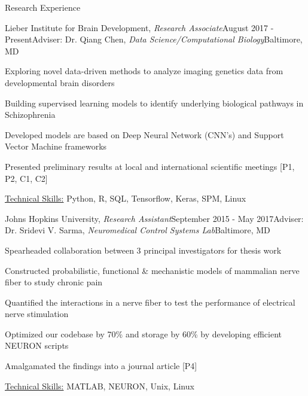 \documentclass{resume}
\begin{document}
  \begin{rSection}{Research Experience}
\begin{rSubsection}{Lieber Institute for Brain Development, \textit{Research Associate}}{August 2017 - Present}{Adviser: Dr. Qiang Chen, \textit{Data Science/Computational Biology}}{Baltimore, MD}
\item Exploring novel data-driven methods to analyze imaging genetics data from developmental brain disorders
\item Building supervised learning models to identify underlying biological pathways in Schizophrenia
\item Developed models are based on Deep Neural Network (CNN's) and Support Vector Machine frameworks
\item Presented preliminary results at local and international scientific meetings [P1, P2, C1, C2]
\item \uline{Technical Skills:} Python, R, SQL, Tensorflow, Keras, SPM, Linux
    \end{rSubsection}

    \begin{rSubsection}{Johns Hopkins University, \textit{Research Assistant}}{September 2015 - May 2017}{Adviser: Dr. Sridevi V. Sarma, \textit{Neuromedical Control Systems Lab}}{Baltimore, MD}
\item Spearheaded collaboration between 3 principal investigators for thesis work
\item Constructed probabilistic, functional \& mechanistic models of mammalian nerve fiber to study chronic pain
\item Quantified the interactions in a nerve fiber to test the performance of electrical nerve stimulation
\item Optimized our codebase by 70\% and storage by 60\% by developing efficient NEURON scripts
\item Amalgamated the findings into a journal article [P4]
\item \uline{Technical Skills:} MATLAB, NEURON, Unix, Linux
    \end{rSubsection}
  

\end{rSection}
\end{document}
